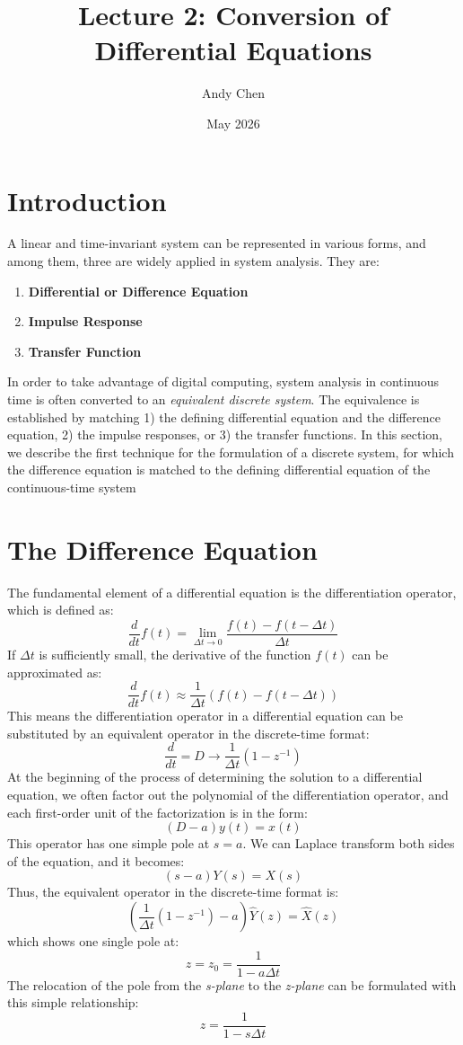 \documentclass{article}
\title{Lecture 2: Conversion of Differential Equations}
\author{Andy Chen}
\date{May 2026}
\begin{document}
\maketitle

\section{Introduction}
A linear and time-invariant system can be represented in various forms, and among them, three are widely applied in system analysis. They are:
\begin{enumerate}
    \item \textbf{Differential or Difference Equation}
    \item \textbf{Impulse Response}
    \item \textbf{Transfer Function}
\end{enumerate}
In order to take advantage of digital computing, system analysis in continuous time is often converted to an \textit{equivalent discrete system}. The equivalence is established by matching 1) the defining differential equation and the difference equation, 2) the impulse responses, or 3) the transfer functions. In this section, we describe the first technique for the formulation of a discrete system, for which the difference equation is matched to the defining differential equation of the continuous-time system 

\section{The Difference Equation}
The fundamental element of a differential equation is the differentiation operator, which is defined as:
\[
\frac{d}{dt}f(t)= \lim_{\Delta t\rightarrow0} \frac{f(t) - f(t-\Delta t)}{\Delta t}
\]
If \(\Delta t\) is sufficiently small, the derivative of the function \(f(t)\) can be approximated as:
\[
\frac{d}{dt}f(t) \approx \frac{1}{\Delta t}(f(t)-f(t-\Delta t))
\]
This means the differentiation operator in a differential equation can be substituted by an
equivalent operator in the discrete-time format:
\[
\frac{d}{dt} = D \rightarrow \frac{1}{\Delta t}(1-z^{-1})
\]
At the beginning of the process of determining the solution to a differential equation, we often factor out the polynomial of the differentiation operator, and each first-order unit of the factorization is in the form:
\[
(D-a)y(t)=x(t)
\]
This operator has one simple pole at \(s = a\). We can Laplace transform both sides of the equation, and it becomes:
\[
(s-a)Y(s)=X(s)
\]
Thus, the equivalent operator in the discrete-time format is:
\[
(\frac{1}{\Delta t}(1-z^{-1})-a)\hat{Y}(z)=\hat{X}(z)
\]
which shows one single pole at:
\[
z=z_0=\frac{1}{1-a\Delta t}
\]
The relocation of the pole from the \textit{s-plane} to the \textit{z-plane} can be formulated with this simple relationship:
\[
z=\frac{1}{1-s\Delta t}
\]
\end{document}
